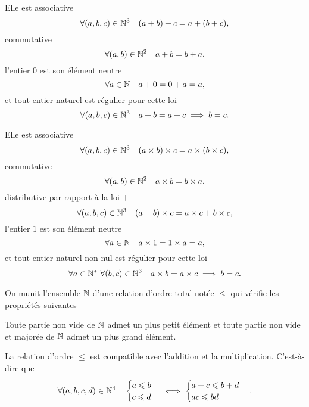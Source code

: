 \begin{prop}[Loi $+$]
  Elle est associative 
  \begin{equation}
    \forall (a,b,c) \in \mathbb{N}^3 \quad (a+b)+c=a+(b+c),
  \end{equation}
  commutative
  \begin{equation}
    \forall (a,b) \in \mathbb{N}^2 \quad a+b=b+a,
  \end{equation}
  l'entier $0$ est son élément neutre
  \begin{equation}
    \forall a \in \mathbb{N} \quad a+0=0+a=a,
  \end{equation}
  et tout entier naturel est régulier pour cette loi
  \begin{equation}
    \forall (a,b,c) \in \mathbb{N}^3 \quad a+b=a+c \implies b=c.
  \end{equation}
\end{prop}
\begin{prop}
  Elle est associative 
  \begin{equation}
    \forall (a,b,c) \in \mathbb{N}^3 \quad (a\times b)\times c=a\times (b\times c),
  \end{equation}
  commutative
  \begin{equation}
    \forall (a,b) \in \mathbb{N}^2 \quad a\times b=b\times a,
  \end{equation}
  distributive par rapport à la loi $+$
  \begin{equation}
    \forall (a,b,c) \in \mathbb{N}^3 \quad (a+ b)\times c=a\times c + b\times c,
  \end{equation}
  l'entier $1$ est son élément neutre
  \begin{equation}
    \forall a \in \mathbb{N} \quad a\times 1=1\times a=a,
  \end{equation}
  et tout entier naturel non nul est régulier pour cette loi
  \begin{equation}
    \forall a \in \mathbb{N}^* \ \forall (b,c) \in \mathbb{N}^3 \quad a\times b=a\times c \implies b=c.
  \end{equation}
\end{prop}
On munit l'ensemble $\mathbb{N}$ d'une relation d'ordre total notée $\leqslant$ qui vérifie les propriétés suivantes
\begin{prop}
  Toute partie non vide de $\mathbb{N}$ admet un plus petit élément et toute partie non vide et majorée de $\mathbb{N}$ admet un plus grand élément.
\end{prop}
\begin{prop}
  La relation d'ordre $\leqslant$ est compatible avec l'addition et la multiplication. C'est-à-dire que
  \begin{equation}
    \forall (a,b,c,d)\in \mathbb{N}^4 \quad
    \begin{cases}
      a\leqslant b \\ c \leqslant d
    \end{cases}
    \iff
    \begin{cases}
      a+c\leqslant b+d \\ ac\leqslant bd
    \end{cases}.
  \end{equation}
\end{prop}

